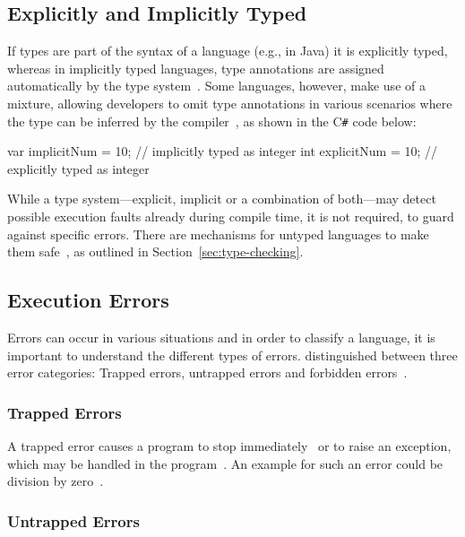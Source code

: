 \subsection{Explicitly and Implicitly Typed}
\label{sec:explicitly-implicitly-typed}

If types are part of the syntax of a language (e.g., in Java) it is explicitly typed, whereas in implicitly typed languages, type annotations are assigned automatically by the type system~\cite[pp.~2--3]{TypeSystems:Cardelli:2004}. Some languages, however, make use of a mixture, allowing developers to omit type annotations in various scenarios where the type can be inferred by the compiler~\cite[p.~10]{TypesAndProgrammingLanguages:Pierce:2002}, as shown in the C\texttt{\#} code below:
\begin{CsCode}[numbers=none]
var implicitNum = 10; // implicitly typed as integer
int explicitNum = 10; // explicitly typed as integer
\end{CsCode}
While a type system---explicit, implicit or a combination of both---may detect possible execution faults already during compile time, it is not required, to guard against specific errors. There are mechanisms for untyped languages to make them safe~\cite[p.~3]{TypeSystems:Cardelli:2004}, as outlined in Section~\ref{sec:type-checking}.

\subsection{Execution Errors}
\label{sec:execution-errors}

Errors can occur in various situations and in order to classify a language, it is important to understand the different types of errors. \citeauthor{TypeSystems:Cardelli:2004} distinguished between three error categories: Trapped errors, untrapped errors and forbidden errors~\cite[p.~3]{TypeSystems:Cardelli:2004}.

\subsubsection{Trapped Errors}

A trapped error causes a program to stop immediately~\cite[p.~3]{TypeSystems:Cardelli:2004} or to raise an exception, which may be handled in the program~\cite[p.~7]{TypesAndProgrammingLanguages:Pierce:2002}. An example for such an error could be division by zero~\cite[p.~3]{TypeSystems:Cardelli:2004}.

\subsubsection{Untrapped Errors}

